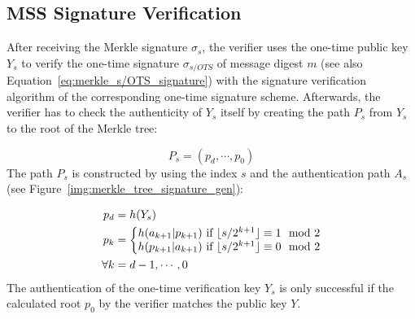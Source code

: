 \subsection{MSS Signature Verification}
After receiving the Merkle signature $\sigma_s$, the verifier uses the one-time public key $Y_s$ to verify the one-time signature $\sigma_{s/OTS}$ of message digest $m$ (see also Equation~\ref{eq:merkle_s/OTS_signature}) with the signature verification algorithm of the corresponding one-time signature scheme.
Afterwards, the verifier has to check the authenticity of $Y_s$ itself by creating the path $P_s$ from $Y_s$ to the root of the Merkle tree:

\begin{equation}
P_s = (p_d, \cdots, p_0)
\end{equation}
The path $P_s$ is constructed by using the index $s$ and the authentication path $A_s$ (see Figure~\ref{img:merkle_tree_signature_gen}):

\begin{align}
\label{eq:merkle_verifier_path_calculation}
p_d &= h(Y_s) \\
p_{k} &= 
\left\{\begin{matrix} \nonumber
h(a_{k+1} | p_{k+1}) \text{ if } \lfloor s/2^{k+1}\rfloor \equiv 1 \mod{2} \\
h(p_{k+1} | a_{k+1}) \text{ if } \lfloor s/2^{k+1}\rfloor \equiv 0 \mod{2}
\end{matrix}\right.  \nonumber \\
\forall k &= d-1, \cdots, 0 \nonumber 
\end{align}
The authentication of the one-time verification key $Y_s$ is only successful if the calculated root $p_0$ by the verifier matches the public key $Y$.


